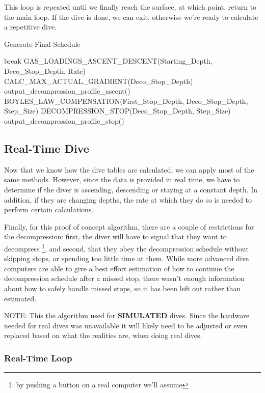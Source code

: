 \documentclass[12pt]{article}
\begin{document}
This loop is repeated until we finally reach the surface, at which point, return to the main loop.
If the dive is done, we can exit, otherwise we're ready to calculate a repetitive dive.

\begin{algorithm}
\caption{Generate Final Schedule}
\label{pre5}
\begin{algorithmic}
\STATE  break
\ENDIF
\STATE GAS\_LOADINGS\_ASCENT\_DESCENT(Starting\_Depth, Deco\_Stop\_Depth, Rate)
\STATE CALC\_MAX\_ACTUAL\_GRADIENT(Deco\_Stop\_Depth)
\STATE output\_decompression\_profile\_ascent()
\STATE BOYLES\_LAW\_COMPENSATION(First\_Stop\_Depth, Deco\_Stop\_Depth, Step\_Size)
\STATE DECOMPRESSION\_STOP(Deco\_Stop\_Depth, Step\_Size)
\STATE output\_decompression\_profile\_stop()
\ENDWHILE
\end{algorithmic}
\end{algorithm}

\subsection{Real-Time Dive}

Now that we know how the dive tables are calculated, we can apply most of the same methods. However,
since the data is provided in real time, we have to determine if the diver is ascending, descending
or staying at a constant depth. In addition, if they are changing depths, the rate at which they
do so is needed to perform certain calculations.

Finally, for this proof of concept algorithm, there are a couple of restrictions for the
decompression: first, the diver will have to signal that they want to decompress \footnote{by pushing a button
on a real computer we'll assume}, and second, that they obey the decompression 
schedule without skipping stops, or spending too
little time at them. While more advanced dive computers are able to give a best effort estimation of how to
continue the decompression schedule after a missed stop, there wasn't enough information about
how to safely handle missed stops, so it has been left out rather than estimated.

NOTE: This the algorithm used for \textbf{SIMULATED} dives. Since the hardware needed for real dives
was unavailable it will likely need to be adjusted or even replaced based on what the realities are, 
when doing real dives.

\subsubsection{Real-Time Loop}
\end{document}
